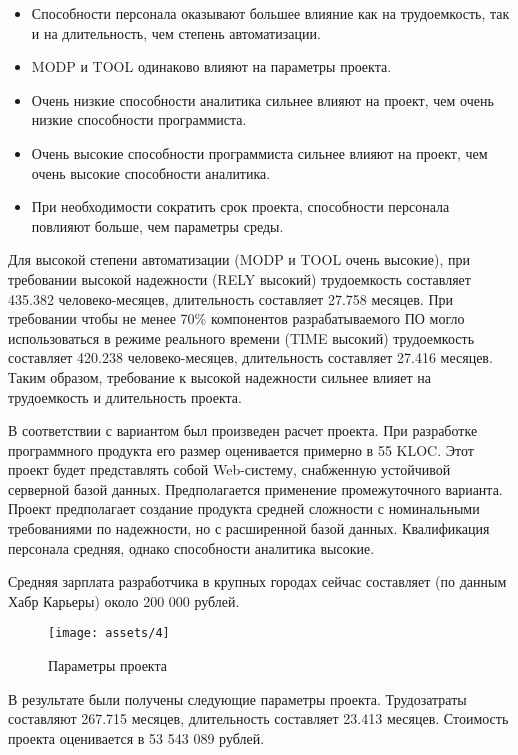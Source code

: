 \begin{itemize}
	\item Способности персонала оказывают большее влияние как на трудоемкость, так и на длительность, чем степень автоматизации.
	\item MODP и TOOL одинаково влияют на параметры проекта.
	\item Очень низкие способности аналитика сильнее влияют на проект, чем очень низкие способности программиста.
	\item Очень высокие способности программиста сильнее влияют на проект, чем очень высокие способности аналитика.
	\item При необходимости сократить срок проекта, способности персонала повлияют больше, чем параметры среды.
\end{itemize}

Для высокой степени автоматизации (MODP и TOOL очень высокие), при требовании высокой надежности (RELY высокий) трудоемкость составляет 435.382 человеко-месяцев, длительность составляет 27.758 месяцев. При требовании чтобы не менее 70\% компонентов разрабатываемого ПО могло использоваться в режиме реального времени (TIME высокий) трудоемкость составляет 420.238 человеко-месяцев, длительность составляет 27.416 месяцев. Таким образом, требование к высокой надежности сильнее влияет на трудоемкость и длительность проекта.

В соответствии с вариантом был произведен расчет проекта. При разработке программного продукта его размер оценивается примерно в 55 KLOC. Этот проект будет представлять собой Web-систему, снабженную устойчивой серверной базой данных. Предполагается применение промежуточного варианта. Проект предполагает создание продукта средней сложности с номинальными требованиями по надежности, но с расширенной базой данных. Квалификация персонала средняя, однако способности аналитика высокие. 

Средняя зарплата разработчика в крупных городах сейчас составляет (по данным Хабр Карьеры) около 200 000 рублей.

\begin{figure}[H]
    \begin{center}
    \texttt{[image: assets/4]}
    \caption{Параметры проекта}
    \label{fig:4}
    \end{center}
\end{figure}

В результате были получены следующие параметры проекта. Трудозатраты составляют 267.715 месяцев, длительность составляет 23.413 месяцев. Стоимость проекта оценивается в 53 543 089 рублей.

